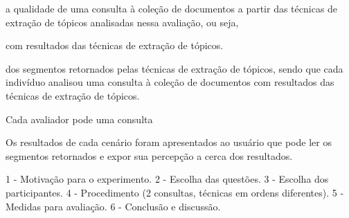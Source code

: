 



a qualidade de uma consulta à coleção de documentos a partir das técnicas de extração de tópicos analisadas nessa avaliação, ou seja, 








com resultados das técnicas de extração de tópicos. 


dos segmentos retornados pelas técnicas de extração de tópicos, sendo que cada indivíduo analisou uma consulta à coleção de documentos com resultados das técnicas de extração de tópicos. 




Cada avaliador pode  uma consulta 





Os resultados de cada cenário foram apresentados ao usuário que pode ler os segmentos retornados e expor sua percepção a cerca dos resultados.





 1 - Motivação para o experimento.
 2 - Escolha das questões.
 3 - Escolha dos participantes.
 4 - Procedimento (2 consultas, técnicas em ordens diferentes).
 5 - Medidas para avaliação.
 6 - Conclusão e discussão.



